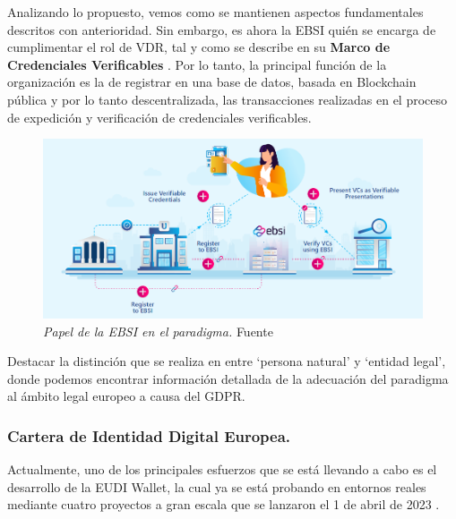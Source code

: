 \documentclass[../main.tex]{subfiles}
\begin{document}
Analizando lo propuesto, vemos como se mantienen aspectos fundamentales  descritos con anterioridad. Sin embargo, es ahora la \acrshort{EBSI} quién se encarga de cumplimentar el rol de \acrshort{VDR}, tal y como se describe en su \textbf{Marco de Credenciales Verificables} \cite{ebsiVCF}. Por lo tanto, la principal función de la organización es la de registrar en una base de datos, basada en Blockchain pública y por lo tanto descentralizada, las transacciones realizadas en el proceso de expedición y verificación de credenciales verificables.  
\\

\begin{figure}[htbp]
    \centering
    \includegraphics[width=1\linewidth]{images/EBSI.png}
    \caption{\textit{Papel de la \acrshort{EBSI} en el paradigma.} Fuente \cite{ebsiVCF}}
    \label{fig:EBSI}
\end{figure}

\begin{tcolorbox}[colback=gray!10!white, colframe=gray!50!black, title=Observación \theobservacion]\label{observacion-europa}
Destacar la distinción que se realiza en \cite{w3c} entre `persona natural' y `entidad legal', donde podemos encontrar información detallada de la adecuación del paradigma al ámbito legal europeo a causa del \acrfull{GDPR}.
\end{tcolorbox} 


\newpage
\subsubsection{Cartera de Identidad Digital Europea.}

Actualmente, uno de los principales esfuerzos que se está llevando a cabo es el desarrollo de la \acrfull{EUDI Wallet}, la cual ya se está probando en entornos reales mediante cuatro proyectos a gran escala que se lanzaron el 1 de abril de 2023 \cite{EuropeanDigitalIdentity}. 
\\
\end{document}
